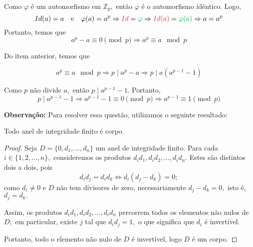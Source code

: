 \documentclass[11pt,a4paper]{article}
\newcommand{\pers}[1]{\textcolor{Floresta}{$\negrito{(#1)} $}}
\begin{document}
{{\task[\pers{b}] Como $\varphi$ é um automorfismo em $\mathbb{Z}_p,$ então $\varphi$ é o automorfismo idêntico. Logo,
\[
Id(a) = a \quad \mbox{e} \quad \varphi(a) = a^p \Rightarrow \textcolor{Red}{Id} = \textcolor{Green}{\varphi} \Rightarrow  \textcolor{Red}{Id(a)} = \textcolor{Green}{\varphi(a)} \Rightarrow a = a^p
\]
Portanto, temos que
\[
a^p - a \equiv 0 \pmod p \Rightarrow \boxed{a^p \equiv a \mod p}
\]

\task[\pers{c}] Do item anterior, temos que 

\[a^p \equiv a \mod p \Rightarrow p \mid a^p - a \Rightarrow p \mid a(a^{p-1} - 1)\]

Como $p$ não divide $a,$ então $p \mid a^{p-1} - 1.$ Portanto,
\[
p \mid a^{p-1} - 1 \Rightarrow a^{p-1} - 1 \equiv 0 \pmod p \Rightarrow \boxed{a^{p-1} \equiv 1 \pmod p}
\]
}
\textbf{Observação:} Para resolver essa questão, utilizamos o seguinte resultado:
\begin{proposicao}
Todo anel de integridade finito é corpo.
\end{proposicao}
\begin{proof}
Seja $D = \{0, d_1, \ldots, d_n \}$ um anel de integridade finito. Para cada $i \in \{ 1 , 2 , \ldots , n\},$ consideremos os produtos $d_id_1, d_id_2, \ldots , d_id_n.$ Estes são distintos dois a dois, pois 
\[d_id_j = d_id_k \Leftrightarrow d_i(d_j - d_k) = 0;\] como $d_i \neq 0$ e $D$ não tem divisores de zero, necessariamente $d_j - d_k = 0,$ isto é, $d_j = d_k.$

Assim, os produtos $d_id_1, d_id_2, \ldots , d_id_n$ percorrem todos os elementos não nulos de $D;$ em particular, existe $j$ tal que $d_id_j = 1,$ o que significa que $d_i$ é invertível.

Portanto, todo o elemento não nulo de $D$ é invertível, logo $D$ é um corpo.
\end{proof}
}
\end{document}

